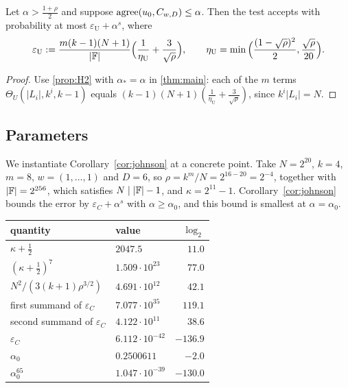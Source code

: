 \begin{corollary}\label{cor:ud}
Let $\alpha>\frac{1+\rho}2$ and suppose $\mathrm{agree}(u_0,C_{w,D})\le\alpha$. Then the test accepts with
probability at most $\varepsilon_{\mathrm U}+\alpha^s$, where
\[
\varepsilon_{\mathrm U}:=\frac{m(k-1)(N+1)}{|\mathbb{F}|}\Big(\frac1{\eta_{\mathrm U}}+\frac3{\sqrt\rho}\Big),
\qquad \eta_{\mathrm U}=\min\Big(\frac{(1-\sqrt\rho)^2}2,\frac{\sqrt\rho}{20}\Big).
\]
\end{corollary}

\begin{proof}
Use \cref{prop:H2} with $\alpha_*=\alpha$ in \cref{thm:main}: each of the $m$ terms
$\Theta_U(|L_i|,k^i,k-1)$ equals $(k-1)(N+1)(\frac1{\eta_{\mathrm U}}+\frac3{\sqrt\rho})$, since
$k^i|L_i|=N$.
\end{proof}

\subsection{Parameters}\label{sec:numbers}

We instantiate Corollary~\ref{cor:johnson} at a concrete point. Take $N=2^{20}$, $k=4$, $m=8$,
$w=(1,\dots,1)$ and $D=6$, so $\rho=k^m/N=2^{16-20}=2^{-4}$, together with $|\mathbb{F}|=2^{256}$, which
satisfies $N\mid|\mathbb{F}|-1$, and $\kappa=2^{11}-1$. Corollary~\ref{cor:johnson} bounds the error by
$\varepsilon_C+\alpha^s$ with $\alpha\ge\alpha_0$, and this bound is smallest at
$\alpha=\alpha_0$.

\begin{center}
\renewcommand{\arraystretch}{1.15}
\begin{tabular}{@{}p{6.4cm}lr@{}}
\hline
quantity & value & $\log_2$ \\
\hline
$\kappa+\tfrac12$ & $2047.5$ & $11.0$ \\
$(\kappa+\tfrac12)^7$ & $1.509\cdot10^{23}$ & $77.0$ \\
$N^2/(3(k+1)\rho^{3/2})$ & $4.691\cdot10^{12}$ & $42.1$ \\
first summand of $\varepsilon_C$ & $7.077\cdot10^{35}$ & $119.1$ \\
second summand of $\varepsilon_C$ & $4.122\cdot10^{11}$ & $38.6$ \\
$\varepsilon_C$ & $6.112\cdot10^{-42}$ & $-136.9$ \\
$\alpha_0$ & $0.2500611$ & $-2.0$ \\
$\alpha_0^{65}$ & $1.047\cdot10^{-39}$ & $-130.0$ \\
\hline
\end{tabular}
\end{center}

